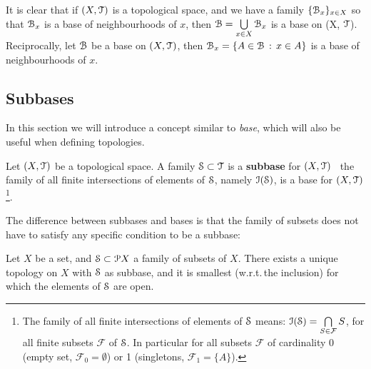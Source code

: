 It is clear that if $(X,\T)$ is a topological space, and we have a family
$\{\B_x\}_{x\in X}$ so that $\B_x$ is a base of neighbourhoods of $x$, then
$\B=\bigcup\limits_{x\in X}\B_x$ is a base on (X, $\T$).
Reciprocally, let $\B$ be a base on $(X, \T)$, then $\B_x = \setdef{A\in\B}{x\in A}$ is
a base of neighbourhoods of $x$.

\subsection{Subbases}\label{subsec:subbases}

In this section we will introduce a concept similar to \emph{base}, which will also be
useful when defining topologies.

\begin{definition}
\label{def:subbase}
	Let $(X, \T)$ be a topological space.
	A family $\S\subset \T$ is a \textbf{subbase}	for $(X, \T)$ \iff\ the family of all finite intersections
	of elements of $\S$, namely	$\I(\S)$, is a base for $(X, \T)$\footnote{The family of all finite intersections of
	elements of $\S$ means: $\I(\S) = \bigcap\limits_{S\in\mathcal{F}} S$, for all finite subsets
	$\mathcal{F}$ of $\S$. In particular for all subsets $\mathcal{F}$ of cardinality
	0 (empty set, $\mathcal{F}_0=\emptyset$) or 1 (singletons, $\mathcal{F}_1=\{A\}$).}.
\end{definition}

The difference between subbases and bases is that the family of subsets does not have
to satisfy any specific condition to be a subbase:

\begin{theorem}
	Let $X$ be a set, and $\S\subset \P X$ a family of subsets of $X$.
	There exists a unique topology on $X$ with $\S$ as subbase, and it is smallest
	(w.r.t.\,the inclusion) for which the elements of $\S$ are open.
	\label{th:1-4}
\end{theorem}

